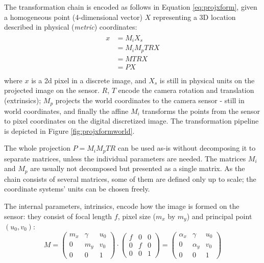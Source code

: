 The transformation chain is encoded as follows in Equation \ref{eq:projxform}, given a homogeneous point (4-dimensional vector) $X$ representing a 3D location described in physical (\emph{metric}) coordinates:
\begin{align} \label{eq:projxform} \begin{split}
	x
	&= M_i X_s\\
	&= M_i M_p T R X\\
	&= M T R X\\
	&= P X\\
\end{split} \end{align}
where $x$ is a 2d pixel in a discrete image, and $X_s$ is still in physical units on the projected image on the sensor.
$R$, $T$ encode the camera rotation and translation (extrinsics);
$M_p$ projects the world coordinates to the camera sensor - still in world coordinates, and finally the affine $M_i$ transforms the points from the sensor to pixel coordinates on the digital discretized image.
The transformation pipeline is depicted in Figure \ref{fig:projxformworld}.



The whole projection $P = M_i M_p T R$ can be used as-is without decomposing it to separate matrices, unless the individual parameters are needed.
The matrices $M_i$ and $M_p$ are usually not decomposed but presented as a single matrix.
As the chain consists of several matrices, some of them are defined only up to scale; the coordinate systems' units can be chosen freely.


The internal parameters, intrinsics, encode how the image is formed on the sensor: they consist of focal length $f$, pixel size ($m_x$ by $m_y$) and principal point $(u_0, v_0)$:
\begin{equation}
	M =
	\begin{pmatrix}
		m_x & \gamma & u_0\\
		0   &    m_y & v_0\\
		0   &        0 & 1
	\end{pmatrix}
\cdot
	\begin{pmatrix}
		f & 0 & 0\\
		0 & f & 0\\
		0 & 0 & 1
	\end{pmatrix}
	=
	\begin{pmatrix}
		\alpha_x & \gamma   & u_0\\
		0        & \alpha_y & v_0\\
		0        & 0        & 1
	\end{pmatrix}
\end{equation}

